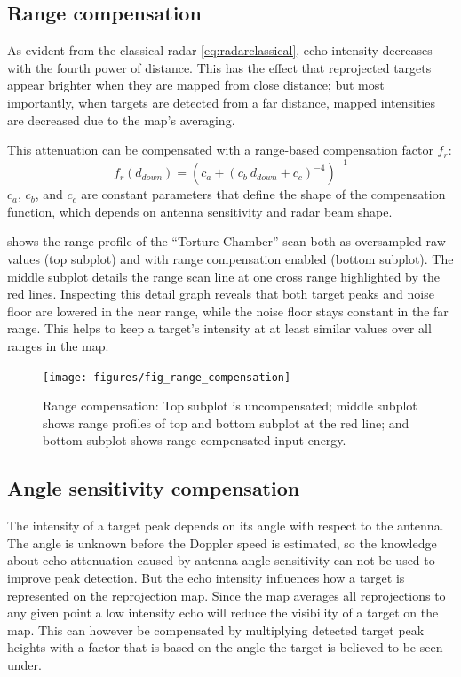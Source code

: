 \subsection{Range compensation}\label{range-compensation}

As evident from the classical radar \cref{eq:radarclassical}, echo intensity decreases with
the fourth power of distance. This has the effect that reprojected
targets appear brighter when they are mapped from close distance; but
most importantly, when targets are detected from a far distance, mapped
intensities are decreased due to the map's averaging.

This attenuation can be compensated with a range-based compensation
factor \(f_r\):
\begin{equation} \label{eq:range_comp}
    f_r(d_{down}) = {
    \left(
    c_a + ( c_b~d_{down} + c_c)^{-4}
    \right) ^ {-1}
    }
\end{equation}
$c_a$, $c_b$, and $c_c$ are constant parameters that define the shape of the compensation function, which depends on antenna sensitivity and radar beam shape.

 shows the range profile of the ``Torture Chamber'' scan
both as oversampled raw values (top subplot) and with range compensation
enabled (bottom subplot). The middle subplot details the range scan line
at one cross range highlighted by the red lines. Inspecting this detail
graph reveals that both target peaks and noise floor are lowered in the
near range, while the noise floor stays constant in the far range. This
helps to keep a target's intensity at at least similar values over all
ranges in the map.

\begin{figure}[htbp]
    \centering
    \texttt{[image: figures/fig\_range\_compensation]}
    \caption{Range compensation: Top subplot is uncompensated; middle subplot shows range profiles of top and bottom subplot at the red line; and bottom subplot shows range-compensated input energy.}
    \label{fig:fig_range_compensation}
\end{figure}


\subsection{Angle sensitivity compensation} \label{angle-sensitivity-compensation}

The intensity of a target peak depends on its angle with respect to the
antenna. The angle is unknown before the Doppler speed is estimated, so
the knowledge about echo attenuation caused by antenna angle sensitivity
can not be used to improve peak detection. But the echo intensity
influences how a target is represented on the reprojection map. Since
the map averages all reprojections to any given point a low intensity
echo will reduce the visibility of a target on the map. This can however
be compensated by multiplying detected target peak heights with a factor
that is based on the angle the target is believed to be seen under.

